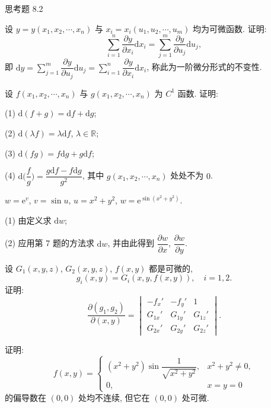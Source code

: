 \begin{exblock}{思考题 8.2}
  \item 设 $y = y(x_{1}, x_{2}, \cdots, x_{n})$ 与 $x_{i} = x_{i}(u_{1}, u_{2}, \cdots, u_{m})$ 均为可微函数. 证明:
  \[
    \sum_{i=1}^{n}\frac{\partial y}{\partial x_{i}}\mathrm{d}x_{i} = \sum_{j=1}^{m}\frac{\partial y}{\partial u_{j}}\mathrm{d}u_{j},
  \]
  即 $\mathrm{d}y = \sum_{j=1}^{m}\dfrac{\partial y}{\partial u_{j}}\mathrm{d}u_{j} = \sum_{i=1}^{n}\dfrac{\partial y}{\partial x_{i}}\mathrm{d}x_{i}$, 称此为一阶微分形式的不变性.

  \item 设 $f(x_{1}, x_{2}, \cdots, x_{n})$ 与 $g(x_{1}, x_{2}, \cdots, x_{n})$ 为 $C^{1}$ 函数. 证明:

  (1) $\mathrm{d}(f + g) = \mathrm{d}f + \mathrm{d}g$;

  (2) $\mathrm{d}(\lambda f) = \lambda\mathrm{d}f$, $\lambda \in \mathbb{R}$;

  (3) $\mathrm{d}(fg) = f\mathrm{d}g + g\mathrm{d}f$;

  (4) $\mathrm{d}\Big(\dfrac{f}{g}\Big) = \dfrac{g\mathrm{d}f - f\mathrm{d}g}{g^{2}}$, 其中 $g(x_{1}, x_{2}, \cdots, x_{n})$ 处处不为 $0$.

  \item $w = \mathrm{e}^{v}$, $v = \sin u$, $u = x^{2} + y^{2}$, $w = \mathrm{e}^{\sin(x^{2} + y^{2})}$.

  (1) 由定义求 $\mathrm{d}w$;

  (2) 应用第 7 题的方法求 $\mathrm{d}w$, 并由此得到 $\dfrac{\partial w}{\partial x}$, $\dfrac{\partial w}{\partial y}$.

  \item 设 $G_{1}(x, y, z)$, $G_{2}(x, y, z)$, $f(x, y)$ 都是可微的,
  \[
    g_{i}(x, y) = G_{i}(x, y, f(x, y)), \quad i = 1, 2.
  \]
  证明:
  \[
    \frac{\partial(g_{1}, g_{2})}{\partial(x, y)} = \begin{vmatrix}
      -f_{x}' & -f_{y}' & 1 \\ G_{1x}' & G_{1y}' & G_{1z}' \\ G_{2x}' & G_{2y}' & G_{2z}'
    \end{vmatrix}.
  \]

  \item 证明:
  \[
    f(x, y) = \begin{cases}
      (x^{2} + y^{2})\sin\dfrac{1}{\sqrt{x^{2} + y^{2}}}, & x^{2} + y^{2} \neq 0, \\[2.5mm]
      0, & x = y = 0
    \end{cases}
  \]
  的偏导数在 $(0, 0)$ 处均不连续, 但它在 $(0, 0)$ 处可微.


\end{exblock}
